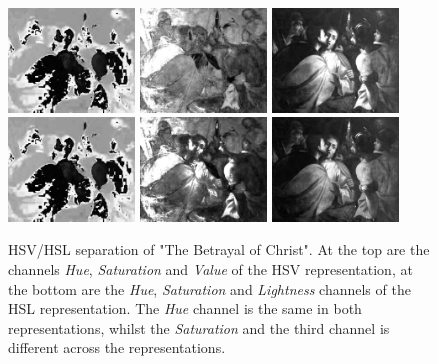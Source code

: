 \documentclass[11pt,a4paper,draft]{report}
\begin{document}
\begin{multicols}{2}
\begin{figure}[tbp]
\centering
\includegraphics[width=0.30\textwidth]{H_caravaggio_1962_139_1}
\includegraphics[width=0.30\textwidth]{SHSV_caravaggio_1962_139_1}
\includegraphics[width=0.30\textwidth]{V_caravaggio_1962_139_1}
\includegraphics[width=0.30\textwidth]{H_caravaggio_1962_139_1}
\includegraphics[width=0.30\textwidth]{SHSL_caravaggio_1962_139_1}
\includegraphics[width=0.30\textwidth]{L_caravaggio_1962_139_1}
\caption[HSV/HSL separation]{HSV/HSL separation of "The Betrayal of Christ".
At the top are the channels \emph{Hue}, \emph{Saturation} and \emph{Value} of
the HSV representation, at the bottom are the \emph{Hue}, \emph{Saturation} and
\emph{Lightness} channels of the HSL representation.  The \emph{Hue} channel is
the same in both representations, whilst the \emph{Saturation} and the third
channel is different across the representations.}
\label{fig:hsvl}
\end{figure}


\end{multicols}
\end{document}

